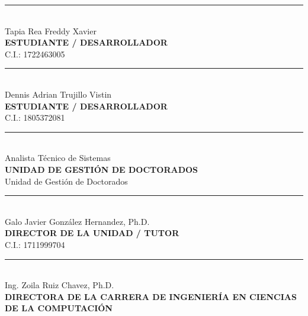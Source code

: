 \noindent
\begin{minipage}[t]{0.45\linewidth}
    \centering
    \rule{5.8cm}{0.4pt} \\[0.2cm]
    Tapia Rea Freddy Xavier \\
    \textbf{ESTUDIANTE / DESARROLLADOR} \\
    C.I.: 1722463005
\end{minipage}%
\hfill
\begin{minipage}[t]{0.45\linewidth}
    \centering
    \rule{5.8cm}{0.4pt} \\[0.2cm]
    Dennis Adrian Trujillo Vistin \\
    \textbf{ESTUDIANTE / DESARROLLADOR} \\
    C.I.: 1805372081
\end{minipage}

\vspace{1.5cm}

\noindent
\begin{minipage}[t]{0.45\linewidth}
    \centering
    \rule{5.8cm}{0.4pt} \\[0.2cm]
    Analista Técnico de Sistemas \\
    \textbf{UNIDAD DE GESTIÓN DE DOCTORADOS} \\
    Unidad de Gestión de Doctorados
\end{minipage}%
\hfill
\begin{minipage}[t]{0.45\linewidth}
    \centering
    \rule{5.8cm}{0.4pt} \\[0.2cm]
    Galo Javier González Hernandez, Ph.D. \\
    \textbf{DIRECTOR DE LA UNIDAD / TUTOR} \\
    C.I.: 1711999704
\end{minipage}

\vspace{1.5cm}

\begin{center}
    \begin{minipage}[t]{0.55\linewidth}
        \centering
        \rule{6.5cm}{0.4pt} \\[0.2cm]
        Ing. Zoila Ruiz Chavez, Ph.D. \\
        \textbf{DIRECTORA DE LA CARRERA DE INGENIERÍA EN CIENCIAS DE LA COMPUTACIÓN}
    \end{minipage}
\end{center}

\newpage
